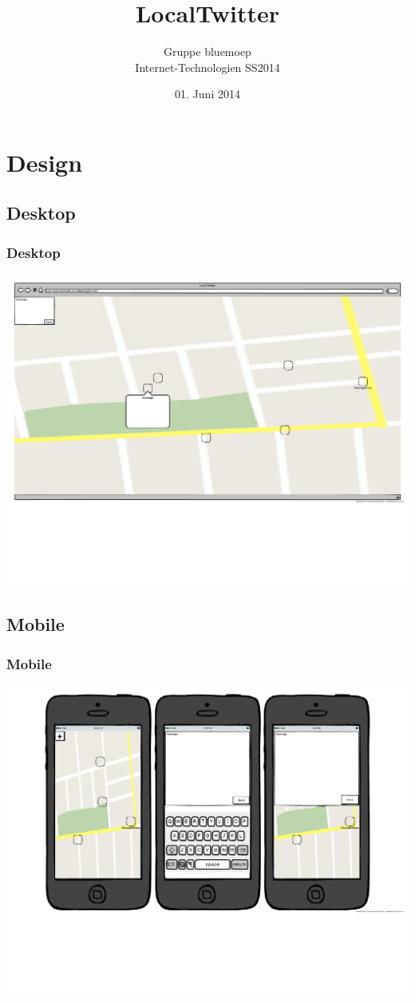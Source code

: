 \documentclass[aspectratio=43]{beamer}
\title{LocalTwitter}
\author{Gruppe bluemoep\\Internet-Technologien SS2014}
\date{01. Juni 2014}
\begin{document}
\frame{\maketitle}
 
\section{Design}
\subsection{Desktop}
\begin{frame}
	\frametitle{Desktop}
	\includegraphics[width=\textwidth]{ITDesktopMockUp.pdf}
\end{frame}

\subsection{Mobile}
\begin{frame}
	\frametitle{Mobile}
	\includegraphics[width=\textwidth]{ITMobileMockUp.pdf}
\end{frame}

\end{document}
